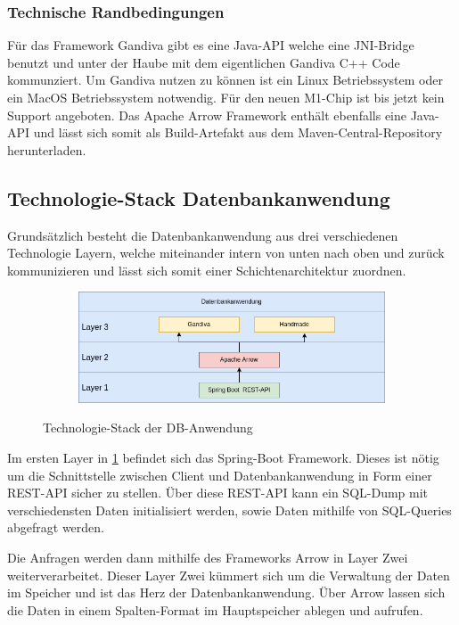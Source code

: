 \subsubsection{Technische Randbedingungen}
Für das Framework Gandiva gibt es eine Java-API welche eine JNI-Bridge benutzt und unter der Haube mit dem eigentlichen Gandiva C++ Code kommunziert.
Um Gandiva nutzen zu können ist ein Linux Betriebssystem oder ein MacOS Betriebssystem notwendig. Für den neuen M1-Chip ist bis jetzt kein Support angeboten.
Das Apache Arrow Framework enthält ebenfalls eine Java-API und lässt sich somit als Build-Artefakt aus dem Maven-Central-Repository herunterladen.


\subsection{Technologie-Stack Datenbankanwendung}

Grundsätzlich besteht die Datenbankanwendung aus drei verschiedenen Technologie Layern, welche miteinander intern von unten nach oben und zurück kommunizieren und lässt sich somit einer Schichtenarchitektur zuordnen. 


\begin{figure}[h]
  \centering
  \begin{subfigure}[b]{1.0\textwidth}
    \includegraphics[width=1.0\linewidth]{img/layerarch}
  \end{subfigure}
  \caption{Technologie-Stack der DB-Anwendung}
  \label{graf_1}
\end{figure}

Im ersten Layer in \ref{graf_1} befindet sich das Spring-Boot Framework.
Dieses ist nötig um die Schnittstelle zwischen Client und Datenbankanwendung in Form einer REST-API sicher zu stellen. 
Über diese REST-API kann ein SQL-Dump mit verschiedensten Daten initialisiert werden, sowie Daten mithilfe von SQL-Queries abgefragt werden.

Die Anfragen werden dann mithilfe des Frameworks Arrow in Layer Zwei weiterverarbeitet. Dieser Layer Zwei kümmert sich um die Verwaltung der Daten im Speicher und ist das Herz der Datenbankanwendung. Über Arrow lassen sich die Daten in einem Spalten-Format im Hauptspeicher ablegen und aufrufen.

